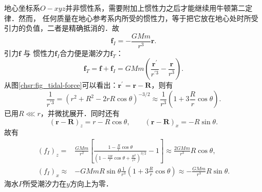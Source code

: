 地心坐标系$O-xyz$并非惯性系，需要附加上惯性力之后才能继续用牛顿第二定律．然而，
任何质量在地心参考系内所受的惯性力，等于把它放在地心处时所受引力的负值，二者是精确抵消的．故
\begin{equation}
    \boldsymbol{f}_{I}=-\frac{GMm}{r^3} \boldsymbol{r} .
\end{equation}
引力$\boldsymbol{f}$ 与 惯性力$\boldsymbol{f}_{I}$合力便是{\heiti 潮汐力}$\boldsymbol{f}_{T}$：
\begin{equation}
    \boldsymbol{f}_{T}=\boldsymbol{f}+\boldsymbol{f}_{I}
    =GMm \left(\frac{\boldsymbol{r}^{\prime}}{r^{\prime 3}} -\frac{\boldsymbol{r}}{r^3}\right) .
\end{equation}
从图\ref{chsr:fig_tidal-force}可以看出：$\boldsymbol{r}^{\prime}=\boldsymbol{r}-\boldsymbol{R}$，则有
\begin{equation}
    \frac{1}{r^{\prime 3}}=\left(r^2+R^2-2 r R \cos \theta\right)^{-3/2}
    \approx  \frac{1}{r^{3}}\left(1+ 3\frac{R}{r}\cos\theta \right) .
\end{equation}
已用$R\lll r$，并微扰展开．同时还有
\begin{equation}
    (\boldsymbol{r}-\boldsymbol{R})_z = r-R \cos \theta, \qquad
    (\boldsymbol{r}-\boldsymbol{R})_x = -R \sin \theta .
\end{equation}
故有
\begin{align}
    \left(f_{I}\right)_z =& \frac{GMm}{r^2}\left[\frac{1-\frac{R}{r} \cos \theta}
    {\left(1-\frac{2 R}{r} \cos \theta+\frac{R^2}{r^2}\right)^{3 / 2}}-1\right] 
    \approx \frac{2 GMm}{r^3} R \cos \theta, \label{chsr:eqn_Tidal-Fz} \\
    \left(f_{I}\right)_x \approx & -GMm R \sin \theta \frac{1}{r^{3}}\left(1+ 3\frac{R}{r}\cos\theta \right)
    \approx -\frac{GMm}{r^3} R \sin \theta .
    \label{chsr:eqn_Tidal-Fx}
\end{align}
海水$P$所受潮汐力在$y$方向上为零．

